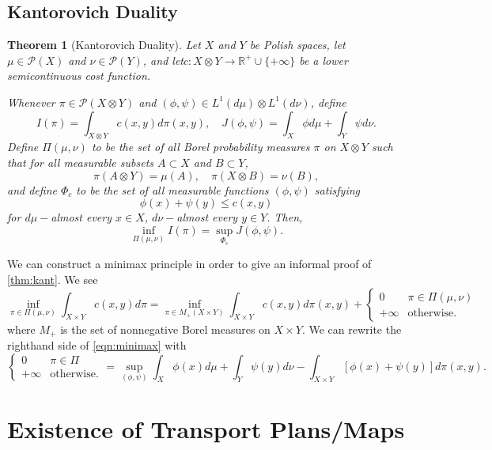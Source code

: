 \documentclass[psamsfonts]{amsart}
\newtheorem{thm}{Theorem}[section]
\theoremstyle{definition}
\numberwithin{equation}{section}
\begin{document}
\subsection{Kantorovich Duality}
\begin{thm}[Kantorovich Duality]\label{thm:kant}
Let $X$ and $Y$ be Polish spaces, let $\mu\in \mathcal{P}(X)$ and $\nu\in\mathcal{P}(Y)$, and let\hfill\break $c: X\otimes Y\to \mathbb{R}^+\cup\{+\infty\}$ be a lower semicontinuous cost function.

  Whenever $\pi \in \mathcal{P}(X\otimes Y)$ and $(\phi,\psi)\in L^1(d\mu)\otimes L^1(d\nu)$, define 
  \[I(\pi)= \int_{X\otimes Y}c(x,y)d\pi(x,y),\quad J(\phi,\psi) = \int_X\phi d\mu + \int_Y\psi d\nu.\]
  Define $\Pi(\mu,\nu)$ to be the set of all Borel probability measures $\pi$ on $X\otimes Y$ such that for all measurable subsets $A\subset X$ and $B\subset Y$,
  \[\pi(A\otimes Y) = \mu(A),\quad \pi(X\otimes B)= \nu(B),\]
  and define $\Phi_c$ to be the set of all measurable functions $(\phi,\psi)$ satisfying
  \begin{equation}
    \phi(x) + \psi(y) \le c(x,y)
  \end{equation}
  for $d\mu-$almost every $x\in X$, $d\nu-$almost every $y\in Y$. Then,
  \begin{equation}
    \inf_{\Pi(\mu,\nu)} I(\pi) = \sup_{\Phi_c}{J(\phi,\psi)}.
  \end{equation}
\end{thm}
We can construct a minimax principle in order to give an informal proof of \autoref{thm:kant}. We see 
\begin{equation}\label{eqn:minimax}
  \inf_{\pi\in\Pi(\mu,\nu)} \int_{X\times Y}c(x,y)d\pi = \inf_{\pi\in M_+(X\times Y)} \int_{X\times Y} c(x,y)d\pi(x,y)+ \begin{cases}0 &\pi\in\Pi(\mu,\nu) \\ +\infty &\text{otherwise.}\end{cases} 
\end{equation}
where $M_+$ is the set of nonnegative Borel measures on $X\times Y$. We can rewrite the righthand side of \autoref{eqn:minimax} with
\[\begin{cases}
  0 &\pi\in \Pi \\
  +\infty &\text{otherwise.}
\end{cases} = \sup_{(\phi,\psi)}\int_{X}\phi(x)d\mu + \int_{Y}\psi(y)d\nu- \int_{X\times Y} [\phi(x)+\psi(y)]d\pi(x,y).\]
\section{Existence of Transport Plans/Maps}
\end{document}
